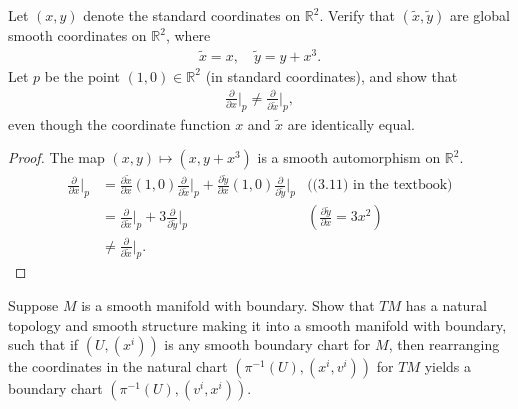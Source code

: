 \begin{customexer}{3.17}
  Let $(x, y)$ denote the standard coordinates on $\mathbb{R}^2$.
  Verify that $(\tilde{x}, \tilde{y})$ are global smooth coordinates on $\mathbb{R}^2$, where
  \begin{align*}
    \tilde{x} = x, \quad \tilde{y} = y + x^3.
  \end{align*}
  Let $p$ be the point $(1, 0) \in \mathbb{R}^2$ (in standard coordinates), and show that
  \begin{align*}
    \frac{\partial}{\partial x}\Big\vert_p \ne \frac{\partial}{\partial \tilde{x}}\Big\vert_p,
  \end{align*}
  even though the coordinate function $x$ and $\tilde{x}$ are identically equal.
\end{customexer}

\begin{proof}
  The map $(x, y) \mapsto (x, y + x^3)$ is a smooth automorphism on $\mathbb{R}^2$.
  \begin{align*}
    \frac{\partial}{\partial x}\Big\vert_p
      &= \frac{\partial \tilde{x}}{\partial x}(1, 0)\frac{\partial}{\partial \tilde{x}}\Big\vert_p + \frac{\partial \tilde{y}}{\partial x}(1, 0)\frac{\partial}{\partial \tilde{y}}\Big\vert_p & \text{((3.11) in the textbook)} \\
      &= \frac{\partial}{\partial \tilde{x}}\Big\vert_p + 3\frac{\partial}{\partial \tilde{y}}\Big\vert_p & (\frac{\partial \tilde{y}}{\partial x} = 3x^2) \\
      &\ne \frac{\partial}{\partial \tilde{x}}\Big\vert_p.
  \end{align*}
\end{proof}

\begin{customexer}{3.19}
  Suppose $M$ is a smooth manifold with boundary.
  Show that $TM$ has a natural topology and smooth structure making it into a smooth manifold with boundary, such that if $(U, (x^i))$ is any smooth boundary chart for $M$, then rearranging the coordinates in the natural chart $(\pi^{-1}(U), (x^i, v^i))$ for $TM$ yields a boundary chart $(\pi^{-1}(U), (v^i, x^i))$.
\end{customexer}

